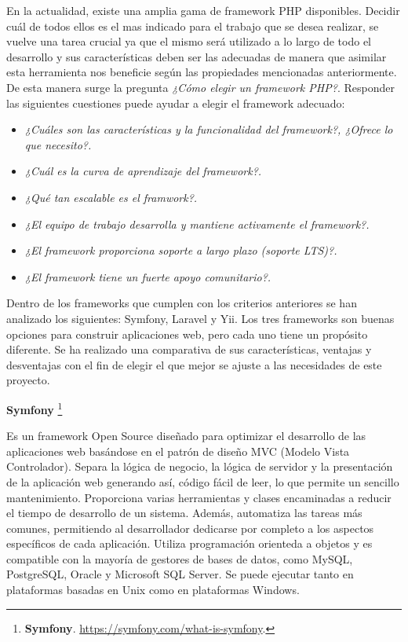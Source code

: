 \documentclass[11pt,oneside]{book}
\begin{document}
En la actualidad, existe una amplia gama de framework PHP disponibles. Decidir cuál de todos ellos es el mas indicado para el trabajo que se desea realizar, se vuelve una tarea crucial ya que el mismo será utilizado a lo largo de todo el desarrollo y sus características deben ser las adecuadas de manera que asimilar esta herramienta nos beneficie según las propiedades mencionadas anteriormente. De esta manera surge la pregunta \textit{¿Cómo elegir un framework PHP?}. Responder las siguientes cuestiones puede ayudar a elegir el framework adecuado:
\begin{itemize}
\item \textit{¿Cuáles son las características y la funcionalidad del framework?, ¿Ofrece lo que necesito?.}
\item \textit{¿Cuál es la curva de aprendizaje del framework?.}
\item \textit{¿Qué tan escalable es el framwork?.}
\item \textit{¿El equipo de trabajo desarrolla y mantiene activamente el framework?.}
\item \textit{¿El framework proporciona soporte a largo plazo (soporte LTS)?.}
\item \textit{¿El framework tiene un fuerte apoyo comunitario?.}
\end{itemize}

Dentro de los frameworks que cumplen con los criterios anteriores se han analizado los siguientes: Symfony, Laravel y Yii. Los tres frameworks son buenas opciones para construir aplicaciones web, pero cada uno tiene un propósito diferente. Se ha realizado una comparativa de sus características, ventajas y desventajas con el fin de elegir el que mejor se ajuste a las necesidades de este proyecto.

\textbf{Symfony} \footnote{\textbf{Symfony}. \url{https://symfony.com/what-is-symfony}.}

Es un framework Open Source diseñado para optimizar el desarrollo de las aplicaciones web basándose en el patrón de diseño MVC (Modelo Vista Controlador). Separa la lógica de negocio, la lógica de servidor y la presentación de la aplicación web generando así, código fácil de leer, lo que permite un sencillo mantenimiento. Proporciona varias herramientas y clases encaminadas a reducir el tiempo de desarrollo de un sistema. Además, automatiza las tareas más comunes, permitiendo al desarrollador dedicarse por completo a los aspectos específicos de cada aplicación. Utiliza programación orienteda a objetos y es compatible con la mayoría de gestores de bases de datos, como MySQL, PostgreSQL, Oracle y Microsoft SQL Server. Se puede ejecutar tanto en plataformas basadas en Unix como en plataformas Windows.
\end{document}
